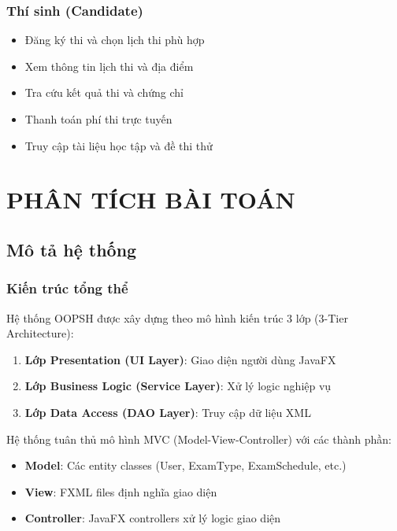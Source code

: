 \documentclass[12pt,a4paper]{article}
\begin{document}
\subsubsection{Thí sinh (Candidate)}
\begin{itemize}
    \item Đăng ký thi và chọn lịch thi phù hợp
    \item Xem thông tin lịch thi và địa điểm
    \item Tra cứu kết quả thi và chứng chỉ
    \item Thanh toán phí thi trực tuyến
    \item Truy cập tài liệu học tập và đề thi thử
\end{itemize}

\section{PHÂN TÍCH BÀI TOÁN}

\subsection{Mô tả hệ thống}

\subsubsection{Kiến trúc tổng thể}

Hệ thống OOPSH được xây dựng theo mô hình kiến trúc 3 lớp (3-Tier Architecture):

\begin{enumerate}
    \item \textbf{Lớp Presentation (UI Layer)}: Giao diện người dùng JavaFX
    \item \textbf{Lớp Business Logic (Service Layer)}: Xử lý logic nghiệp vụ
    \item \textbf{Lớp Data Access (DAO Layer)}: Truy cập dữ liệu XML
\end{enumerate}

Hệ thống tuân thủ mô hình MVC (Model-View-Controller) với các thành phần:

\begin{itemize}
    \item \textbf{Model}: Các entity classes (User, ExamType, ExamSchedule, etc.)
    \item \textbf{View}: FXML files định nghĩa giao diện
    \item \textbf{Controller}: JavaFX controllers xử lý logic giao diện
\end{itemize}
\end{document}
